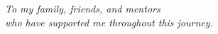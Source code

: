 \vspace*{\fill}
\begin{center}
    \large\itshape
    To my family, friends, and mentors\\
    who have supported me throughout this journey.
\end{center}
\vspace*{\fill}
\clearpage 
